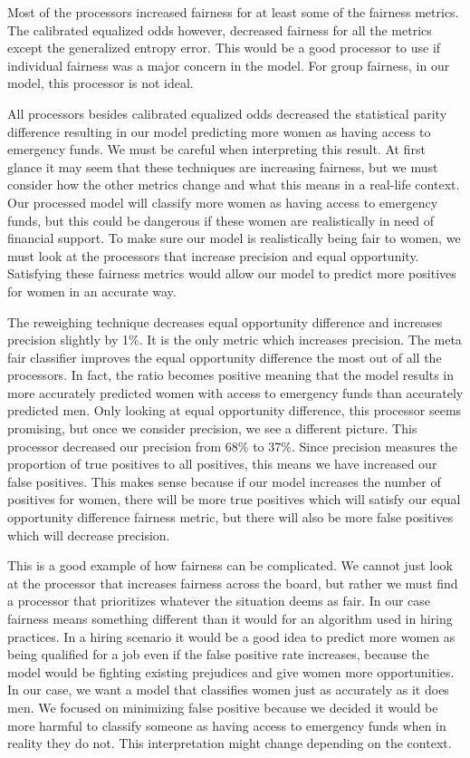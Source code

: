 \documentclass[water,article,submit,moreauthors,pdftex]{mdpi}
\begin{document}
Most of the processors increased fairness for at least some of the
fairness metrics. The calibrated equalized odds however, decreased
fairness for all the metrics except the generalized entropy error. This
would be a good processor to use if individual fairness was a major
concern in the model. For group fairness, in our model, this processor
is not ideal.

All processors besides calibrated equalized odds decreased the
statistical parity difference resulting in our model predicting more
women as having access to emergency funds. We must be careful when
interpreting this result. At first glance it may seem that these
techniques are increasing fairness, but we must consider how the other
metrics change and what this means in a real-life context. Our processed
model will classify more women as having access to emergency funds, but
this could be dangerous if these women are realistically in need of
financial support. To make sure our model is realistically being fair to
women, we must look at the processors that increase precision and equal
opportunity. Satisfying these fairness metrics would allow our model to
predict more positives for women in an accurate way.

The reweighing technique decreases equal opportunity difference and
increases precision slightly by 1\%. It is the only metric which
increases precision. The meta fair classifier improves the equal
opportunity difference the most out of all the processors. In fact, the
ratio becomes positive meaning that the model results in more accurately
predicted women with access to emergency funds than accurately predicted
men. Only looking at equal opportunity difference, this processor seems
promising, but once we consider precision, we see a different picture.
This processor decreased our precision from 68\% to 37\%. Since
precision measures the proportion of true positives to all positives,
this means we have increased our false positives. This makes sense
because if our model increases the number of positives for women, there
will be more true positives which will satisfy our equal opportunity
difference fairness metric, but there will also be more false positives
which will decrease precision.

This is a good example of how fairness can be complicated. We cannot
just look at the processor that increases fairness across the board, but
rather we must find a processor that prioritizes whatever the situation
deems as fair. In our case fairness means something different than it
would for an algorithm used in hiring practices. In a hiring scenario it
would be a good idea to predict more women as being qualified for a job
even if the false positive rate increases, because the model would be
fighting existing prejudices and give women more opportunities. In our
case, we want a model that classifies women just as accurately as it
does men. We focused on minimizing false positive because we decided it
would be more harmful to classify someone as having access to emergency
funds when in reality they do not. This interpretation might change
depending on the context.
\end{document}
